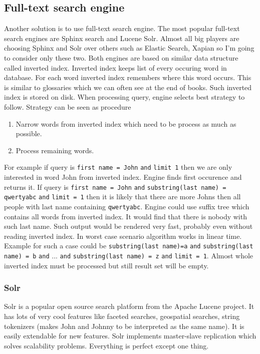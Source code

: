 \documentclass[10pt,a4paper]{article}
\begin{document}
\subsection{Full-text search engine}
Another solution is to use full-text search engine. The most popular full-text search engines are Sphinx search and Lucene Solr. Almost all big players are choosing Sphinx and Solr over others such as Elastic Search, Xapian so I'm going to consider only these two. Both engines are based on similar data structure called inverted index. Inverted index keeps list of every occuring word in database. For each word inverted index remembers where this word occurs. This is similar to glossaries which we can often see at the end of books. Such inverted index is stored on disk. When processing query, engine selects best strategy to follow. Strategy can be seen as procedure
\begin{enumerate}
\item Narrow words from inverted index which need to be process as much as possible. 
\item Process remaining words. 
\end{enumerate}
For example if query is \verb|first name = John| \verb|and| \verb|limit 1| then we are only interested in word John from inverted index. Engine finds first occurence and returns it. If query is \verb|first name = John| \verb|and| \verb|substring(last name) = qwertyabc| \verb|and| \verb|limit = 1| then it is likely that there are more Johns then all people with last name containing \verb|qwertyabc|. Engine could use suffix tree which contains all words from inverted index. It would find that there is nobody with such last name. Such output would be rendered very fast, probably even without reading inverted index. In worst case scenario algorithm works in linear time. Example for such a case could be \verb|substring(last name)=a| \verb|and| \verb|substring(last name) = b| \verb|and| ... \verb|and| \verb|substring(last name) = z| \verb|and| \verb|limit = 1|. Almost whole inverted index must be processed but still result set will be empty.

\subsubsection{Solr}

Solr is a popular open source search platform from the Apache Lucene project. It has lots of very cool features like faceted searches, geospatial searches, string tokenizers (makes John and Johnny to be interpreted as the same name). It is easily extendable for new features. Solr implements master-slave replication which solves scalability problems. Everything is perfect except one thing. 
\end{document}

